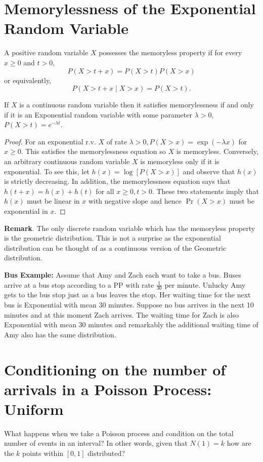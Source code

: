 \documentclass[11pt]{elegantbook}
\begin{document}
\section{Memorylessness of the Exponential Random Variable}
\begin{definition}[Memorylessness]
    A positive random variable $X$ possesses the memoryless property if for every $x \geq 0$ and $t>0$,
    $$
    P(X>t+x)=P(X>t) P(X>x)
    $$
    or equivalently,
    $$
    P(X>t+x \mid X>x)=P(X>t) .
    $$
\end{definition}
\begin{lemma}
    If $X$ is a continuous random variable then it satisfies memorylessness if and only if it is an Exponential random variable with some parameter $\lambda>0$, $P(X>t)=e^{-\lambda t}$.
\end{lemma}
\begin{proof}
    For an exponential r.v. $X$ of rate $\lambda>0, P(X>x)=\exp (-\lambda x)$ for $x \geq 0$. This satisfies the memorylessness equation so $X$ is memoryless. Conversely, an arbitrary continuous random variable $X$ is memoryless only if it is exponential. To see this, let $h(x)=\log [P(X>x)]$ and observe that $h(x)$ is strictly decreasing. In addition, the memorylessness equation says that $h(t+x)=h(x)+h(t)$ for all $x \geq 0, t>0$. These two statements imply that $h(x)$ must be linear in $x$ with negative slope and hence $\operatorname{Pr}(X>x)$ must be exponential in $x$.
\end{proof}

\textbf{Remark}. The only discrete random variable which has the memoryless property is the geometric distribution. This is not a surprise as the exponential distribution can be thought of as a continuous version of the Geometric distribution.

\textbf{Bus Example:} Assume that Amy and Zach each want to take a bus. Buses arrive at a bus stop according to a PP with rate $\frac{1}{30}$ per minute. Unlucky Amy gets to the bus stop just as a bus leaves the stop. Her waiting time for the next bus is Exponential with mean 30 minutes. Suppose no bus arrives in the next 10 minutes and at this moment Zach arrives. The waiting time for Zach is also Exponential with mean 30 minutes and remarkably the additional waiting time of Amy also has the same distribution.

\section{Conditioning on the number of arrivals in a Poisson Process: Uniform}
What happens when we take a Poisson process and condition on the total number of events in an interval? In other words, given that $N(1)=k$ how are the $k$ points within $[0,1]$ distributed?
\end{document}
